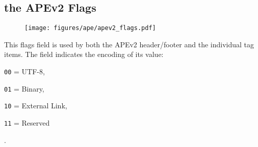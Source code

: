 \subsection{the APEv2 Flags}
\begin{figure}[h]
\texttt{[image: figures/ape/apev2\_flags.pdf]}
\end{figure}
\par
\noindent
This flags field is used by both the APEv2 header/footer and the
individual tag items.
The  field indicates the encoding of its value:

\begin{inparaenum}
\item[\texttt{00} = ] UTF-8,
\item[\texttt{01} = ] Binary,
\item[\texttt{10} = ] External Link,
\item[\texttt{11} = ] Reserved
\end{inparaenum}
.
